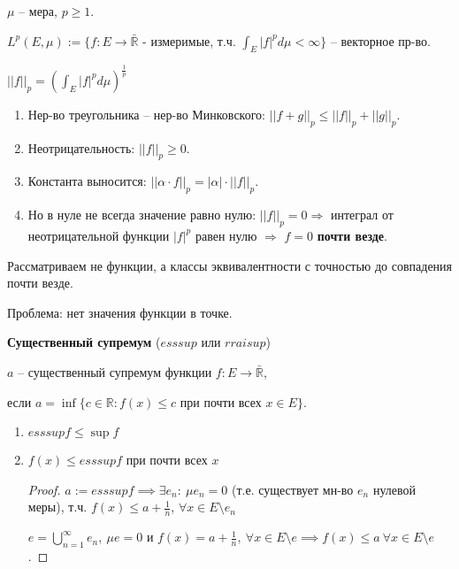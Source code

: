 
\begin{definition}
    $\mu$ -- мера, $p \geq 1$.

    $L^{p} (E, \mu) := \{f : E \rightarrow \bar{\mathbb{R}}$ - измеримые, т.ч. $\int_{E} |f|^p d\mu < \infty\}$  -- векторное пр-во.

    $|| f ||_p = \left( \int_{E} |f|^p d\mu \right)^{\frac{1}{p}}$

    \begin{enumerate}
        \item Нер-во треугольника -- нер-во Минковского: $||f+g||_p \leq ||f||_p + ||g||_p$.
        \item Неотрицательность: $|| f ||_{p} \geq 0$.
        \item Константа выносится: $|| \alpha \cdot f ||_p = |\alpha| \cdot ||f||_p$.
        \item Но в нуле не всегда значение равно нулю: $||f||_p = 0 \Rightarrow$ интеграл от неотрицательной функции $|f|^p$ равен нулю $\Rightarrow$ $f = 0$ \textbf{почти везде}.
    \end{enumerate}

    Рассматриваем не функции, а классы эквивалентности с точностью до совпадения почти везде.

    Проблема: нет значения функции в точке.
\end{definition}

\begin{definition}
    \textbf{Существенный супремум} ($esssup$ или $rraisup$)

    $a$ -- существенный супремум функции $f: E \rightarrow \bar{\mathbb{R}}$,
    
    если $a = \inf \{ c \in \mathbb{R} : f(x) \leq c \text{ при почти всех $x \in E$}\}$.
\end{definition}

\begin{properties}
    \begin{enumerate}
        \item $esssup f \leq \sup f$
        \item {
            $f(x) \leq esssup f$ при почти всех $x$

            \begin{proof}
                $a := esssup f \implies \exists e_n : \ \mu e_n = 0$ (т.е. существует мн-во $e_n$ нулевой меры), т.ч. $f(x) \leq a + \frac{1}{n}$, $\forall x \in E \setminus e_n$

                $e = \bigcup_{n=1}^{\infty} e_n, \ \mu e = 0$ и $f(x) = a + \frac{1}{n}, \ \forall x \in E \setminus e \implies f(x) \leq a \ \forall x \in E \setminus e$.
            \end{proof}
        }
    \end{enumerate}
\end{properties}

